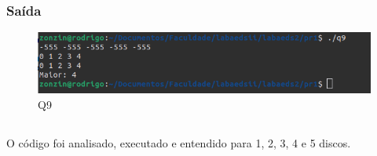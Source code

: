 \subsubsection*{Saída}
\begin{figure}[h!]
	\centering
	\includegraphics[width=0.7\linewidth]{imagens/saida_q9}
	\caption{Q9}
	\label{fig:saidaq9}
\end{figure}

\subsection{}
O código foi analisado, executado e entendido para 1, 2, 3, 4 e 5 discos.

